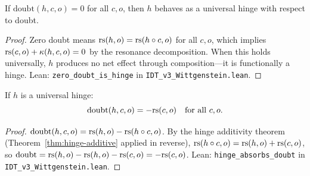 \begin{theorem}
\label{thm:zero-doubt-hinge}
If $\mathrm{doubt}(h, c, o) = 0$ for all $c, o$, then $h$ behaves as a
universal hinge with respect to doubt.
\end{theorem}

\begin{proof}
Zero doubt means $\mathrm{rs}(h, o) = \mathrm{rs}(h \circ c, o)$ for all $c, o$,
which implies $\mathrm{rs}(c, o) + \kappa(h, c, o) = 0$ by the resonance
decomposition. When this holds universally, $h$ produces no net effect
through composition---it is functionally a hinge.
Lean: \texttt{zero\_doubt\_is\_hinge} in \texttt{IDT\_v3\_Wittgenstein.lean}.
\end{proof}

\begin{theorem}
\label{thm:hinge-absorbs-doubt}
If $h$ is a universal hinge:
\[
\mathrm{doubt}(h, c, o) = -\mathrm{rs}(c, o) \quad \text{for all } c, o.
\]
\end{theorem}

\begin{proof}
$\mathrm{doubt}(h, c, o) = \mathrm{rs}(h, o) - \mathrm{rs}(h \circ c, o)$.
By the hinge additivity theorem (Theorem~\ref{thm:hinge-additive} applied
in reverse), $\mathrm{rs}(h \circ c, o) = \mathrm{rs}(h, o) + \mathrm{rs}(c, o)$, so
$\mathrm{doubt} = \mathrm{rs}(h,o) - \mathrm{rs}(h,o) - \mathrm{rs}(c,o) = -\mathrm{rs}(c,o)$.
Lean: \texttt{hinge\_absorbs\_doubt} in \texttt{IDT\_v3\_Wittgenstein.lean}.
\end{proof}

